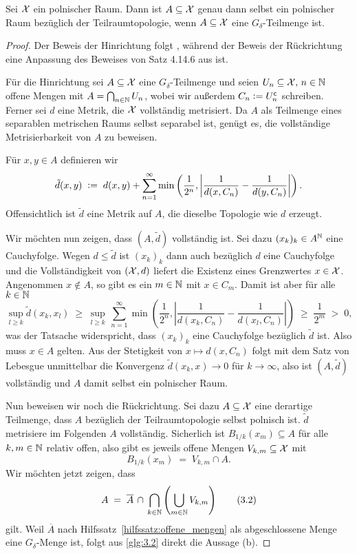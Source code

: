 \documentclass[../thesis/thesis.tex]{subfiles}
\begin{document}
	\begin{Satz}[Alexandroff]
		\label{satz:alexandroff}
		Sei $\mathcal{X}$ ein polnischer Raum. Dann ist $A \subseteq \mathcal{X}$ genau dann selbst ein polnischer Raum bezüglich der Teilraumtopologie, 
		wenn $A \subseteq \mathcal{X}$ eine $G_\delta$-Teilmenge ist.
	\end{Satz}
	
	\begin{proof}
		Der Beweis der Hinrichtung folgt \cite[Satz 7]{JordanBell.2014}, während der Beweis der Rückrichtung eine Anpassung des Beweises
		von Satz 4.14.6 aus \cite[Kapitel 4.14]{Simon.2015} ist.
		
		Für die Hinrichtung sei $A \subseteq \mathcal{X}$ eine $G_\delta$-Teilmenge und seien 
		$U_n \subseteq \mathcal{X}, \, n \in \mathbb{N}$ offene Mengen mit 
		$A = \bigcap_{n \in \mathbb{N}} U_n$, wobei wir außerdem 
		$C_n \vcentcolon = U_n^{\mathsf{c}}$ schreiben. Ferner sei 
		$d$ eine Metrik, die $\mathcal{X}$ vollständig metrisiert. 
		Da $A$ als Teilmenge eines separablen metrischen Raums 
		selbst separabel ist, genügt es, die vollständige Metrisierbarkeit 
		von $A$ zu beweisen.
		
		Für $x, y \in A$ definieren wir
		\[\tilde{d}(x, y) \; \vcentcolon = \; d(x, y) + \sum_{n=1}^{\infty} \min \left(
		\frac{1}{2^n}, \left| \frac{1}{d(x, C_n)} - \frac{1}{d(y, C_n)} \right|
		\right) \text{.}\]
		Offensichtlich ist $\tilde{d}$ eine Metrik auf $A$, 
		die dieselbe Topologie wie $d$ erzeugt. 
		
		Wir möchten nun zeigen, dass $(A, \tilde{d})$ vollständig ist. 
		Sei dazu $(x_k)_k \in A^{\mathbb{N}}$ eine Cauchyfolge. Wegen $d \leq \tilde{d}$ 
		ist $(x_k)_k$ dann auch bezüglich $d$ eine Cauchyfolge und die 
		Vollständigkeit von $(\mathcal{X}, d)$ liefert die Existenz eines Grenzwertes 
		$x \in \mathcal{X}$. Angenommen $x \notin A$, so gibt es ein $m \in \mathbb{N}$ mit 
		$x \in C_m$. Damit ist aber für alle $k \in \mathbb{N}$
		$$\sup_{l \geq k} \tilde{d}(x_k, x_l) \; \geq \; \sup_{l \geq k} 
		\, \sum_{n=1}^{\infty} \min \left(
		\frac{1}{2^n}, \left| \frac{1}{d(x_k, C_n)} -
		\frac{1}{d(x_l, C_n)} \right|
		\right) \; \geq \; \frac{1}{2^m} \; > \; 0 \text{,}$$
		was der Tatsache widerspricht, dass $(x_k)_k$ eine Cauchyfolge 
		bezüglich $\tilde{d}$ ist. Also muss $x \in A$ gelten. 
		Aus der Stetigkeit von $x \mapsto d(x, C_n)$ folgt mit dem 
		Satz von Lebesgue unmittelbar die Konvergenz 
		$\tilde{d}(x_k, x) \to 0$ für $k \to \infty$,
		also ist $(A, \tilde{d})$ vollständig und $A$ damit selbst ein
		polnischer Raum.
		
		Nun beweisen wir noch die Rückrichtung. Sei dazu $A \subseteq \mathcal{X}$ eine derartige Teilmenge, dass
		$A$ bezüglich der Teilraumtopologie selbst polnisch ist. $\tilde{d}$ metrisiere im Folgenden 
		$A$ vollständig.
		Sicherlich ist $B_{1/k}(x_m) \subseteq A$ für alle 
		$k, m \in \mathbb{N}$ relativ offen, also gibt es jeweils offene Mengen 
		$V_{k, m} \subseteq \mathcal{X}$ mit
		\[ B_{1/k}(x_m) \; = \; V_{k, m} 
		\cap A \text{.} \label{glg:3.1} \tag{3.1}\]
		Wir möchten jetzt zeigen, dass
		\[ A \; = \; \overline{A} \, \cap \, 
		\bigcap_{k \in \mathbb{N}} \left( \bigcup_{m \in \mathbb{N}} V_{k, m} \right) 
		\label{glg:3.2} \tag{3.2}\]
		gilt. 
		Weil $\overline{A}$ nach Hilfssatz~\ref{hilfssatz:offene_mengen} 
		als abgeschlossene Menge eine $G_\delta$-Menge ist, 
		folgt aus \eqref{glg:3.2} direkt die Aussage (b).
		

\end{proof}
\end{document}
